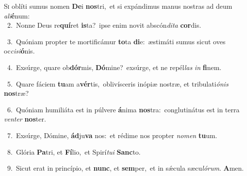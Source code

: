 \lettrine{\initial\textcolor{\initialcolor}{S}}{i} oblíti sumus nomen \textbf{De}\-i \textbf{nos}\-tri,~\star et si expándimus manus nostras ad deum \textit{a}\-\textit{li}\textbf{é}num:\\
{\numbfont\textcolor{\numbcolor}{~2.}}~Nonne Deus re\-\textbf{quí}\-ret \textbf{is}\-ta?~\star ipse enim novit abscón\-\textit{di}\-\textit{ta} \textbf{cor}\-dis.\par
{\numbfont\textcolor{\numbcolor}{~3.}}~Quóniam propter te mortificámur \textbf{to}\-ta \textbf{di}\-e:~\star æstimáti sumus sicut oves oc\-\textit{ci}\-\textit{si}\textbf{ó}nis.\par
{\numbfont\textcolor{\numbcolor}{~4.}}~Exsúrge, quare ob\-\textbf{dór}\-mis, \textbf{Dó}\-mine?~\star exsúrge, et ne repél\textit{las} \textit{in} \textbf{fi}\-nem.\par
{\numbfont\textcolor{\numbcolor}{~5.}}~Quare fáciem \textbf{tu}\-am a\-\textbf{vér}\-tis,~\star oblivísceris inópiæ nostræ, et tribulati\-\textit{ó}\-\textit{nis} \textbf{nos}\-træ?\par
{\numbfont\textcolor{\numbcolor}{~6.}}~Quóniam humiliáta est in púlvere \textbf{á}\-nima \textbf{nos}\-tra:~\star conglutinátus est in terra \textit{ven}\-\textit{ter} \textbf{nos}\-ter.\par
{\numbfont\textcolor{\numbcolor}{~7.}}~Exsúrge, Dómine, \textbf{ád}\-ju\textbf{va} nos:~\star et rédime nos propter \textit{no}\-\textit{men} \textbf{tu}\-um.\par
{\numbfont\textcolor{\numbcolor}{~8.}}~Glória \textbf{Pa}\-tri, et \textbf{Fí}\-lio,~\star et Spirí\-\textit{tu}\-\textit{i} \textbf{Sanc}\-to.\par
{\numbfont\textcolor{\numbcolor}{~9.}}~Sicut erat in princípio, et \textbf{nunc}\-, et \textbf{sem}\-per,~\star et in sǽcula sæcu\-\textit{ló}\-\textit{rum}. \textbf{A}\-men.\par

